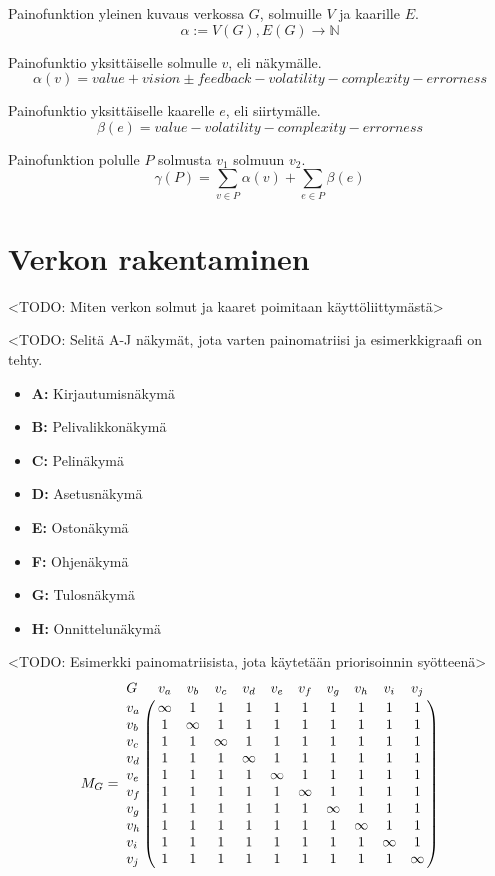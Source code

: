   Painofunktion yleinen kuvaus verkossa \(G\), solmuille \(V\) ja kaarille \(E\).
  \[\alpha := V(G), E(G) \rightarrow \mathbb{N}\]

  Painofunktio yksittäiselle solmulle \(v\), eli näkymälle.
  \[\alpha(v) = value + vision \pm feedback - volatility - complexity - errorness\]

  Painofunktio yksittäiselle kaarelle \(e\), eli siirtymälle.
  \[\beta(e) = value - volatility - complexity - errorness\]

  Painofunktion polulle \(P\) solmusta \(v_1\) solmuun \(v_2\).
  \[\gamma(P) = \sum_{v \in P} \alpha(v) + \sum_{e \in P} \beta(e)\]

\section{Verkon rakentaminen} \label{ch:10_verkon_rakentaminen}

  <TODO: Miten verkon solmut ja kaaret poimitaan käyttöliittymästä>

  <TODO: Selitä A-J näkymät, jota varten painomatriisi ja esimerkkigraafi on tehty.
  \begin{itemize}
    \item \textbf{A:} Kirjautumisnäkymä
    \item \textbf{B:} Pelivalikkonäkymä
    \item \textbf{C:} Pelinäkymä
    \item \textbf{D:} Asetusnäkymä
    \item \textbf{E:} Ostonäkymä
    \item \textbf{F:} Ohjenäkymä
    \item \textbf{G:} Tulosnäkymä
    \item \textbf{H:} Onnittelunäkymä
  \end{itemize}

  <TODO: Esimerkki painomatriisista, jota käytetään priorisoinnin syötteenä>
  \[
    M_G =
    \bordermatrix{
      G & v_a & v_b & v_c & v_d & v_e & v_f & v_g & v_h & v_i & v_j \cr
      v_a & \infty & 1 & 1 & 1 & 1 & 1 & 1 & 1 & 1 & 1 \cr
      v_b & 1 & \infty & 1 & 1 & 1 & 1 & 1 & 1 & 1 & 1 \cr
      v_c & 1 & 1 & \infty & 1 & 1 & 1 & 1 & 1 & 1 & 1 \cr
      v_d & 1 & 1 & 1 & \infty & 1 & 1 & 1 & 1 & 1 & 1 \cr
      v_e & 1 & 1 & 1 & 1 & \infty & 1 & 1 & 1 & 1 & 1 \cr
      v_f & 1 & 1 & 1 & 1 & 1 & \infty & 1 & 1 & 1 & 1 \cr
      v_g & 1 & 1 & 1 & 1 & 1 & 1 & \infty & 1 & 1 & 1 \cr
      v_h & 1 & 1 & 1 & 1 & 1 & 1 & 1 & \infty & 1 & 1 \cr
      v_i & 1 & 1 & 1 & 1 & 1 & 1 & 1 & 1 & \infty & 1 \cr
      v_j & 1 & 1 & 1 & 1 & 1 & 1 & 1 & 1 & 1 & \infty \cr
    }
  \]

